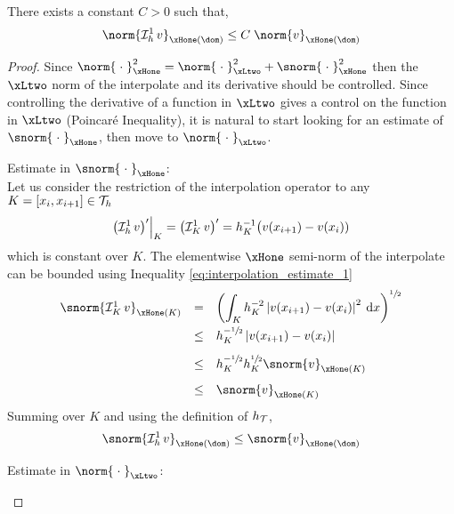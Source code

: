 \begin{prpstn}
\label{prpstn:stability_lagrange_p1}
There exists a constant $C>0$ such that,
\begin{equation}\label{eq:stability_lagrange_p1}
\norm{\Lgrh{1} v}_{\xHone(\dom)} \leq C\; \norm{v}_{\xHone(\dom)}
\end{equation}
\end{prpstn}
\begin{proof}
Since $\norm{\;\cdot\;}^2_{\xHone} = \norm{\;\cdot\;}^2_{\xLtwo} + \snorm{\;\cdot\;}^2_{\xHone}$ then the $\xLtwo$ norm of the interpolate and its derivative should be controlled. Since controlling the derivative of a function in $\xLtwo$ gives a control on the function in $\xLtwo$ (Poincaré Inequality), it is natural to start looking for an estimate of $\snorm{\;\cdot\;}_{\xHone}$, then move to $\norm{\;\cdot\;}_{\xLtwo}$.
\begin{tmaproofitems}
\item Estimate in $\snorm{\;\cdot\;}_{\xHone}$:\\
Let us consider the restriction of the interpolation operator to any $K = [x_{i}, x_{i+1}] \in {\mathcal T}_h$
\[
\Restrict{\bigl(\Lgrh{1}v\bigr)'}{K} = \bigl(\LgrK{1}v\bigr)' = h_K^{-1}\bigl(v(x_{i+1})- v(x_{i}))
\]
which is constant over $K$.
The elementwise $\xHone$ semi-norm of the interpolate can be bounded using Inequality \eqref{eq:interpolation_estimate_1}
\begin{equation*}
\begin{array}{lcl}
\snorm{\LgrK{1}v}_{\xHone(K)} &=&\displaystyle \left(\int_K h_K^{-2}\Abs{v(x_{i+1})- v(x_{i})}^2 \md x\right)^{\sfrac{1}{2}}\\[2ex]
                              &\leq& h_K^{-\sfrac{1}{2}}\Abs{v(x_{i+1})- v(x_{i})}\\[2ex]
                              &\leq& h_K^{-\sfrac{1}{2}} h_K^{\sfrac{1}{2}}\snorm{v}_{\xHone(K)}\\[2ex]
                              &\leq& \snorm{v}_{\xHone(K)}\\
\end{array}
\end{equation*}
Summing over $K$ and using the definition of $h_{\mathcal T}$,
\begin{equation*}
\snorm{\Lgrh{1}v}_{\xHone(\dom)} \leq \snorm{v}_{\xHone(\dom)}
\end{equation*}
\item Estimate in $\norm{\;\cdot\;}_{\xLtwo}$:\\

\end{tmaproofitems}
\end{proof}
